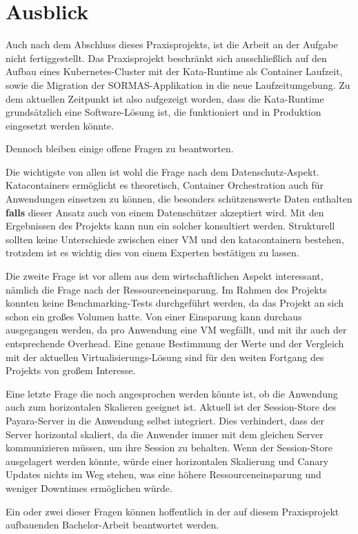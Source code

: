 \chapter{Ausblick}

Auch nach dem Abschluss dieses Praxisprojekts, ist die Arbeit an der Aufgabe nicht fertiggestellt.
Das Praxisprojekt beschränkt sich ausschließlich auf den Aufbau eines Kubernetes-Cluster mit der Kata-Runtime als Container Laufzeit, sowie die Migration der \ac{SORMAS}-Applikation in die neue Laufzeitumgebung.
Zu dem aktuellen Zeitpunkt ist also aufgezeigt worden, dass die Kata-Runtime grundsätzlich eine Software-Lösung ist, die funktioniert und in Produktion eingesetzt werden könnte.

Dennoch bleiben einige offene Fragen zu beantworten.

Die wichtigste von allen ist wohl die Frage nach dem Datenschutz-Aspekt.
Katacontainers ermöglicht es theoretisch, Container Orchestration auch für Anwendungen einsetzen zu können, die besonders schützenswerte Daten enthalten \textbf{falls} dieser Ansatz auch von einem Datenschützer akzeptiert wird.
Mit den Ergebnissen des Projekts kann nun ein solcher konsultiert werden. 
Strukturell sollten keine Unterschiede zwischen einer VM und den katacontainern bestehen, trotzdem ist es wichtig dies von einem Experten bestätigen zu lassen.

Die zweite Frage ist vor allem aus dem wirtschaftlichen Aspekt interessant, nämlich die Frage nach der Ressourceneinsparung.
Im Rahmen des Projekts konnten keine Benchmarking-Tests durchgeführt werden, da das Projekt an sich schon ein großes Volumen hatte.
Von einer Einsparung kann durchaus ausgegangen werden, da pro Anwendung eine \ac{VM} wegfällt, und mit ihr auch der entsprechende Overhead.
Eine genaue Bestimmung der Werte und der Vergleich mit der aktuellen Virtualisierungs-Lösung sind für den weiten Fortgang des Projekts von großem Interesse.

Eine letzte Frage die noch angesprochen werden könnte ist, ob die Anwendung auch zum horizontalen Skalieren geeignet ist.
Aktuell ist der Session-Store des Payara-Server in die Anwendung selbst integriert. 
Dies verhindert, dass der Server horizontal skaliert, da die Anwender immer mit dem gleichen Server kommunizieren müssen, um ihre Session zu behalten.
Wenn der Session-Store ausgelagert werden könnte, würde einer horizontalen Skalierung und Canary Updates nichts im Weg stehen, was eine höhere Ressourceneinsparung und weniger Downtimes ermöglichen würde.

Ein oder zwei dieser Fragen können hoffentlich in der auf diesem Praxisprojekt aufbauenden Bachelor-Arbeit beantwortet werden. 